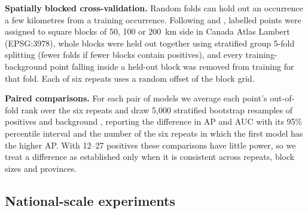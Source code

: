 \documentclass[pdflatex,sn-apa]{sn-jnl}
\begin{document}
\textbf{Spatially blocked cross-validation.} Random folds can hold out an occurrence a few kilometres from a training occurrence. Following \citet{Roberts2017} and \citet{Valavi2019}, labelled points were assigned to square blocks of 50, 100 or 200~km side in Canada Atlas Lambert (EPSG:3978), whole blocks were held out together using stratified group 5-fold splitting (fewer folds if fewer blocks contain positives), and every training-background point falling inside a held-out block was removed from training for that fold. Each of six repeats uses a random offset of the block grid.

\textbf{Paired comparisons.} For each pair of models we average each point's out-of-fold rank over the six repeats and draw 5,000 stratified bootstrap resamples of positives and background \citep{Efron1993}, reporting the difference in AP and AUC with its 95\% percentile interval and the number of the six repeats in which the first model has the higher AP. With 12--27 positives these comparisons have little power, so we treat a difference as established only when it is consistent across repeats, block sizes and provinces.

\subsection{National-scale experiments}\label{sec:national-methods}
\end{document}
